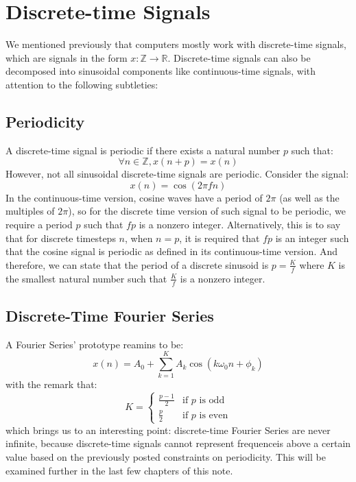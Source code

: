 \section{Discrete-time Signals}
We mentioned previously that computers mostly work with discrete-time signals, which are signals in the form $x: \mathbb{Z} \rightarrow \mathbb{R}$.
Discrete-time signals can also be decomposed into sinusoidal components like continuous-time signals, with attention to the following subtleties:

\subsection{Periodicity}
A discrete-time signal is periodic if there exists a natural number $p$ such that:
\[
    \forall n \in \mathbb{Z}, x(n + p) = x(n)
\]
However, not all sinusoidal discrete-time signals are periodic.
Consider the signal:
\[
    x(n) = \cos(2\pi f n)
\]
In the continuous-time version, cosine waves have a period of $2 \pi$ (as well as the multiples of $2\pi$), so for the discrete time version of such signal to be periodic, we require a period $p$ such that $fp$ is a nonzero integer.
Alternatively, this is to say that for discrete timesteps $n$, when $n = p$, it is required that $fp$ is an integer such that the cosine signal is periodic as defined in its continuous-time version.
And therefore, we can state that the period of a discrete sinusoid is $p = \frac{K}{f}$ where $K$ is the smallest natural number such that $\frac{K}{f}$ is a nonzero integer.

\subsection{Discrete-Time Fourier Series}
A Fourier Series' prototype reamins to be:
\[
    x(n) = A_0 + \sum_{k = 1}^K A_k \cos(k \omega_0 n + \phi_k)
\]
with the remark that:
\[
    K = 
    \begin{cases}
        \frac{p - 1}{2} &\text{if $p$ is odd} \\
        \frac{p}{2} &\text{if $p$ is even}
    \end{cases}
\]
which brings us to an interesting point: discrete-time Fourier Series are never infinite, because discrete-time signals cannot represent frequenceis above a certain value based on the previously posted constraints on periodicity. This will be examined further in the last few chapters of this note.
